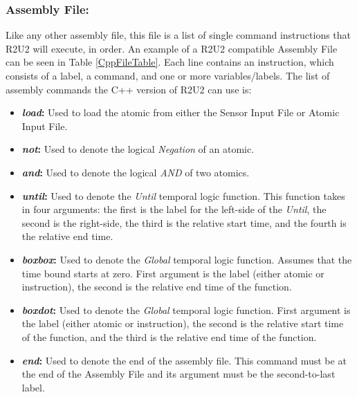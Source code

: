 \subsubsection{Assembly File:}
\label{AssemblyFile}
Like any other assembly file, this file is a list of single command instructions that R2U2 will execute, in order. An example of a R2U2 compatible Assembly File can be seen in Table \ref{CppFileTable}. Each line contains an instruction, which consists of a label, a command, and one or more variables/labels. The list of assembly commands the C++ version of R2U2 can use is:
\begin{itemize}
	\item \textbf{\textit{load}:} Used to load the atomic from either the Sensor Input File or Atomic Input File. 
	\item \textbf{\textit{not}:} Used to denote the logical \textit{Negation} of an atomic.
	\item \textbf{\textit{and}:} Used to denote the logical \textit{AND} of two atomics.
	\item \textbf{\textit{until}:} Used to denote the \textit{Until} temporal logic function. This function takes in four arguments: the first is the label for the left-side of the \textit{Until}, the second is the right-side, the third is the relative start time, and the fourth is the relative end time.
	\item \textbf{\textit{boxbox}:} Used to denote the \textit{Global} temporal logic function. Assumes that the time bound starts at zero. First argument is the label (either atomic or instruction), the second is the relative end time of the function.
	\item \textbf{\textit{boxdot}:} Used to denote the \textit{Global} temporal logic function. First argument is the label (either atomic or instruction), the second is the relative start time of the function, and the third is the relative end time of the function.
	\item \textbf{\textit{end}:} Used to denote the end of the assembly file. This command must be at the end of the Assembly File and its argument must be the second-to-last label.
\end{itemize}

